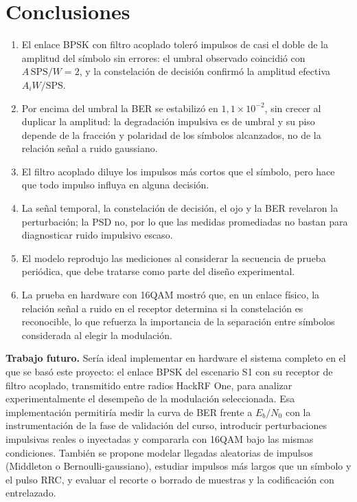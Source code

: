 \section{Conclusiones}\label{sec:conclusiones}

\begin{enumerate}[label=\arabic*), leftmargin=*]
  \item El enlace BPSK con filtro acoplado toleró impulsos de casi el doble de
        la amplitud del símbolo sin errores: el umbral observado coincidió con
        $A\,\mathrm{SPS}/W=2$, y la constelación de decisión confirmó la
        amplitud efectiva $A_iW/\mathrm{SPS}$.
  \item Por encima del umbral la BER se estabilizó en $1{,}1\times10^{-2}$, sin
        crecer al duplicar la amplitud: la degradación impulsiva es de umbral y
        su piso depende de la fracción y polaridad de los símbolos alcanzados,
        no de la relación señal a ruido gaussiano.
  \item El filtro acoplado diluye los impulsos más cortos que el símbolo, pero
        hace que todo impulso influya en alguna decisión.
  \item La señal temporal, la constelación de decisión, el ojo y la BER
        revelaron la perturbación; la PSD no, por lo que las medidas promediadas
        no bastan para diagnosticar ruido impulsivo escaso.
  \item El modelo reprodujo las mediciones al considerar la secuencia de prueba
        periódica, que debe tratarse como parte del diseño experimental.
  \item La prueba en hardware con 16QAM mostró que, en un enlace físico, la
        relación señal a ruido en el receptor determina si la constelación es
        reconocible, lo que refuerza la importancia de la separación entre
        símbolos considerada al elegir la modulación.
\end{enumerate}

\textbf{Trabajo futuro.} Sería ideal implementar en hardware el sistema
completo en el que se basó este proyecto: el enlace BPSK del escenario S1 con
su receptor de filtro acoplado, transmitido entre radios HackRF One, para
analizar experimentalmente el desempeño de la modulación seleccionada. Esa
implementación permitiría medir la curva de BER frente a $E_b/N_0$ con la
instrumentación de la fase de validación del curso, introducir perturbaciones
impulsivas reales o inyectadas y compararla con 16QAM bajo las mismas
condiciones. También se propone modelar llegadas aleatorias de impulsos
(Middleton o Bernoulli-gaussiano), estudiar impulsos más largos que un símbolo
y el pulso RRC, y evaluar el recorte o borrado de muestras y la codificación con
entrelazado.
